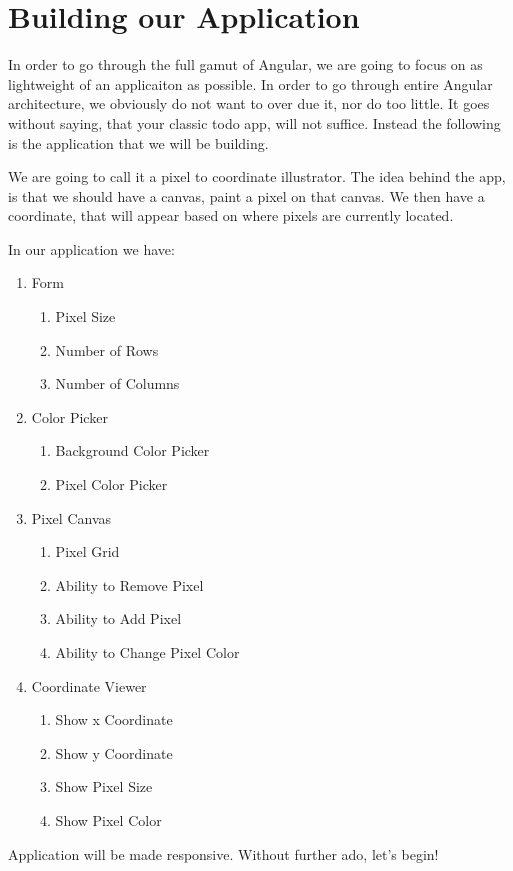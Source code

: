 \maketitle{}
\section{ Building our Application }

In order to go through the full gamut of Angular, we are going to focus on as
lightweight of an applicaiton as possible. In order to go through entire Angular
architecture, we obviously do not want to over due it, nor do too little. It
goes without saying, that your classic todo app, will not suffice. Instead the
following is the application that we will be building.

We are going to call it a pixel to coordinate illustrator. The idea behind the
app, is that we should have a canvas, paint a pixel on that canvas. We then have
a coordinate, that will appear based on where pixels are currently located.

In our application we have:
\begin{enumerate}
  \item Form
    \begin{enumerate}
      \item Pixel Size
      \item Number of Rows
      \item Number of Columns
    \end{enumerate}
  \item Color Picker
    \begin{enumerate}
      \item Background Color Picker
      \item Pixel Color Picker
    \end{enumerate}
  \item Pixel Canvas
    \begin{enumerate}
      \item Pixel Grid
      \item Ability to Remove Pixel
      \item Ability to Add Pixel
      \item Ability to Change Pixel Color
    \end{enumerate}
  \item Coordinate Viewer
    \begin{enumerate}
      \item Show x Coordinate
      \item Show y Coordinate
      \item Show Pixel Size
      \item Show Pixel Color
    \end{enumerate}
\end{enumerate}

Application will be made responsive. Without further ado, let's begin!
